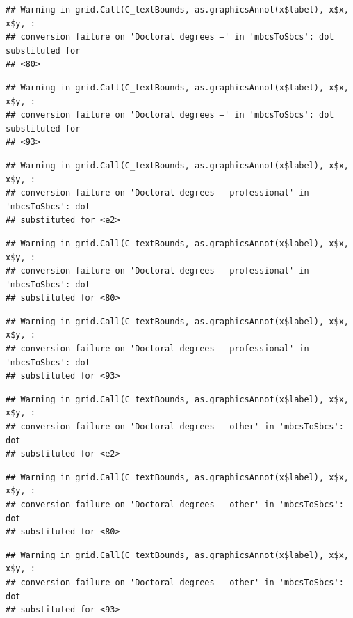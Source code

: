 \documentclass[
]{book}
\begin{document}
\begin{verbatim}
## Warning in grid.Call(C_textBounds, as.graphicsAnnot(x$label), x$x, x$y, :
## conversion failure on 'Doctoral degrees –' in 'mbcsToSbcs': dot substituted for
## <80>
\end{verbatim}

\begin{verbatim}
## Warning in grid.Call(C_textBounds, as.graphicsAnnot(x$label), x$x, x$y, :
## conversion failure on 'Doctoral degrees –' in 'mbcsToSbcs': dot substituted for
## <93>
\end{verbatim}

\begin{verbatim}
## Warning in grid.Call(C_textBounds, as.graphicsAnnot(x$label), x$x, x$y, :
## conversion failure on 'Doctoral degrees – professional' in 'mbcsToSbcs': dot
## substituted for <e2>
\end{verbatim}

\begin{verbatim}
## Warning in grid.Call(C_textBounds, as.graphicsAnnot(x$label), x$x, x$y, :
## conversion failure on 'Doctoral degrees – professional' in 'mbcsToSbcs': dot
## substituted for <80>
\end{verbatim}

\begin{verbatim}
## Warning in grid.Call(C_textBounds, as.graphicsAnnot(x$label), x$x, x$y, :
## conversion failure on 'Doctoral degrees – professional' in 'mbcsToSbcs': dot
## substituted for <93>
\end{verbatim}

\begin{verbatim}
## Warning in grid.Call(C_textBounds, as.graphicsAnnot(x$label), x$x, x$y, :
## conversion failure on 'Doctoral degrees – other' in 'mbcsToSbcs': dot
## substituted for <e2>
\end{verbatim}

\begin{verbatim}
## Warning in grid.Call(C_textBounds, as.graphicsAnnot(x$label), x$x, x$y, :
## conversion failure on 'Doctoral degrees – other' in 'mbcsToSbcs': dot
## substituted for <80>
\end{verbatim}

\begin{verbatim}
## Warning in grid.Call(C_textBounds, as.graphicsAnnot(x$label), x$x, x$y, :
## conversion failure on 'Doctoral degrees – other' in 'mbcsToSbcs': dot
## substituted for <93>
\end{verbatim}
\end{document}
